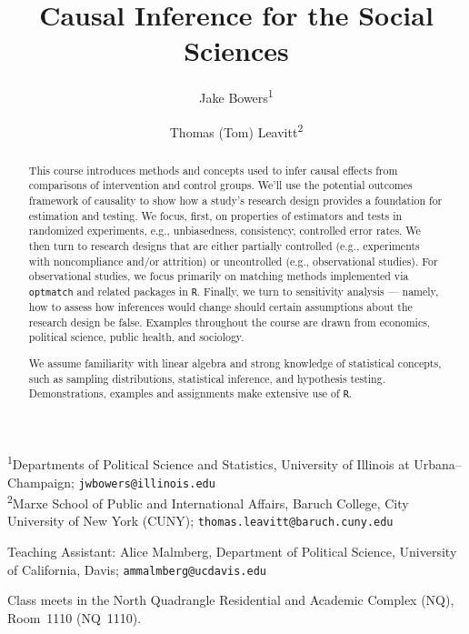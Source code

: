 \documentclass[12pt]{article}
\title{Causal Inference for the Social Sciences}
\author{%
  Jake Bowers\textsuperscript{1} \and
  Thomas (Tom) Leavitt\textsuperscript{2}
}
\begin{document}
\pagestyle{myfancy}
\maketitle

\begin{center}\small
  \textsuperscript{1}Departments of Political Science and Statistics,
  University of Illinois at Urbana–Champaign; \texttt{jwbowers@illinois.edu}\\
  \textsuperscript{2}Marxe School of Public and International Affairs,
  Baruch College, City University of New York (CUNY);
  \texttt{thomas.leavitt@baruch.cuny.edu}
\end{center}

\begin{center}\small
  Teaching Assistant: Alice Malmberg, Department of Political Science,
  University of California, Davis; \texttt{ammalmberg@ucdavis.edu}
\end{center}

\begin{center}\small
  Class meets in the North Quadrangle Residential and Academic Complex (NQ),
  Room~1110 (NQ~1110).
\end{center}

\begin{abstract}
\noindent This course introduces methods and concepts used to infer causal effects from comparisons of intervention and control groups. We'll use the potential outcomes framework of causality to show how a study's research design provides a foundation for estimation and testing. We focus, first, on properties of estimators and tests in randomized experiments, e.g., unbiasedness, consistency, controlled error rates. We then turn to research designs that are either partially controlled (e.g., experiments with noncompliance and/or attrition) or uncontrolled (e.g., observational studies). For observational studies, we focus primarily on matching methods implemented via \texttt{optmatch} and related packages in \texttt{R}. Finally, we turn to sensitivity analysis --- namely, how to assess how inferences would change should certain assumptions about the research design be false. Examples throughout the course are drawn from economics, political science, public health, and sociology.

We assume familiarity with linear algebra and strong knowledge of
statistical concepts, such as sampling distributions, statistical
inference, and hypothesis testing. Demonstrations, examples and
assignments make extensive use of \texttt{R}.
\end{abstract}
\end{document}
